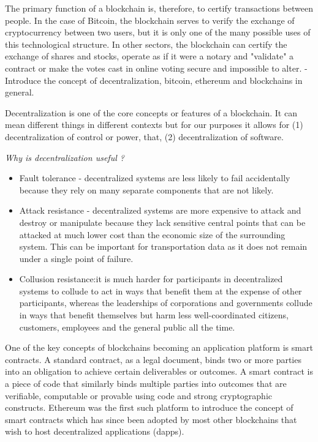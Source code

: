  The primary function of a blockchain is, therefore, to certify transactions between people. In the case of Bitcoin, the
 blockchain serves to verify the exchange of cryptocurrency between two users, but it is only one of the many possible
 uses of this technological structure. In other sectors, the blockchain can certify the exchange of shares and stocks,
 operate as if it were a notary and "validate" a contract or make the votes cast in online voting secure and impossible
 to alter.
- Introduce the concept of decentralization, bitcoin, ethereum and blockchains in general.

Decentralization is one of the core concepts or features of a blockchain. It can mean different things in different
contexts but for our purposes it allows for (1) decentralization of control or power, that, (2) decentralization of
software.

{\em Why is decentralization useful ?}
\begin{itemize}

    \item Fault tolerance - decentralized systems are less likely to fail accidentally because they rely on many separate
components that are not likely.
    \item Attack resistance - decentralized systems are more expensive to attack and destroy or manipulate because they lack
sensitive central points that can be attacked at much lower cost than the economic size of the surrounding system. This
can be important for transportation data as it does not remain under a single point of failure.
    \item Collusion resistance:it is much harder for participants in decentralized systems to collude to act in ways that
benefit them at the expense of other participants, whereas the leaderships of corporations and governments collude in
ways that benefit themselves but harm less well-coordinated citizens, customers, employees and the general public all
the time.
\end{itemize}

One of the key concepts of blockchains becoming an application platform is smart contracts. A standard contract, as a
legal document, binds two or more parties into an obligation to achieve certain deliverables or outcomes. A smart
contract is a piece of code that similarly binds multiple parties into outcomes that are verifiable, computable or
provable using code and strong cryptographic constructs. Ethereum was the first such platform to introduce the concept
of smart contracts which has since been adopted by most other blockchains that wish to host decentralized applications
(dapps).

